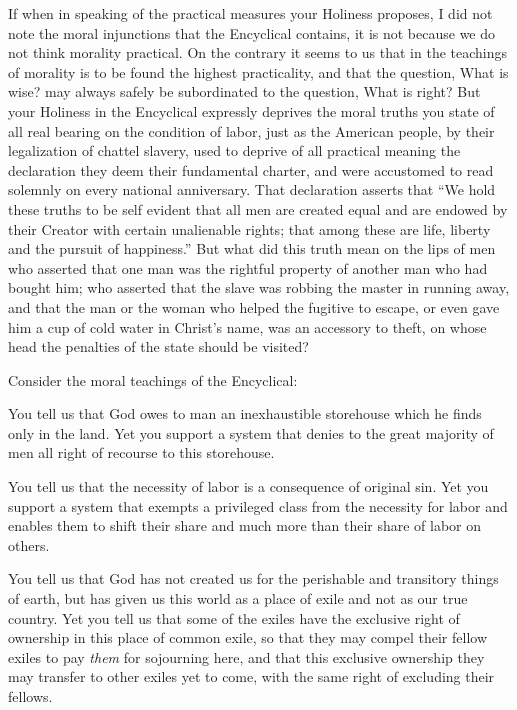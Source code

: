 \documentclass{book}
\begin{document}
If when in speaking of the practical measures your Holiness proposes, I did not note the moral injunctions that the Encyclical contains, it is not because we do not think morality practical. On the contrary it seems to us that in the teachings of morality is to be found the highest practicality, and that the question, What is wise? may always safely be subordinated to the question, What is right? But your Holiness in the Encyclical expressly deprives the moral truths you state of all real bearing on the condition of labor, just as the American people, by their legalization of chattel slavery, used to deprive of all practical meaning the declaration they deem their fundamental charter, and were accustomed to read solemnly on every national anniversary. That declaration asserts that “We hold these truths to be self evident that all men are created equal and are endowed by their Creator with certain unalienable rights; that among these are life, liberty and the pursuit of happiness.” But what did this truth mean on the lips of men who asserted that one man was the rightful property of another man who had bought him; who asserted that the slave was robbing the master in running away, and that the man or the woman who helped the fugitive to escape, or even gave him a cup of cold water in Christ’s name, was an accessory to theft, on whose head the penalties of the state should be visited?

Consider the moral teachings of the Encyclical:

You tell us that God owes to man an inexhaustible storehouse which he finds only in the land. Yet you support a system that denies to the great majority of men all right of recourse to this storehouse.

You tell us that the necessity of labor is a consequence of original sin. Yet you support a system that exempts a privileged class from the necessity for labor and enables them to shift their share and much more than their share of labor on others.

You tell us that God has not created us for the perishable and transitory things of earth, but has given us this world as a place of exile and not as our true country. Yet you tell us that some of the exiles have the exclusive right of ownership in this place of common exile, so that they may compel their fellow exiles to pay \emph{them} for sojourning here, and that this exclusive ownership they may transfer to other exiles yet to come, with the same right of excluding their fellows.
\end{document}
